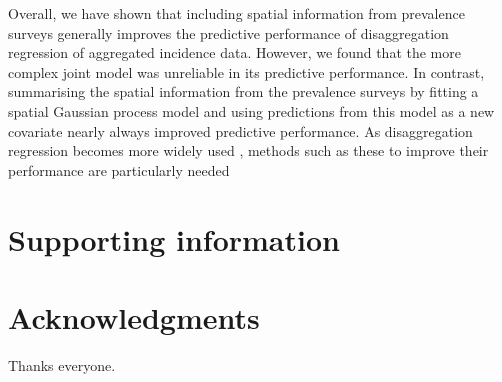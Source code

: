 \documentclass{statsoc}
\begin{document}
Overall, we have shown that including spatial information from prevalence surveys generally improves the predictive performance of disaggregation regression of aggregated incidence data.
However, we found that the more complex joint model was unreliable in its predictive performance.
In contrast, summarising the spatial information from the prevalence surveys by fitting a spatial Gaussian process model and using predictions from this model as a new covariate nearly always improved predictive performance.
As disaggregation regression becomes more widely used \citep{weiss2019mapping, battle2019mapping}, methods such as these to improve their performance are particularly needed


\section*{Supporting information}


\section*{Acknowledgments}
Thanks everyone.






 
\end{document}
